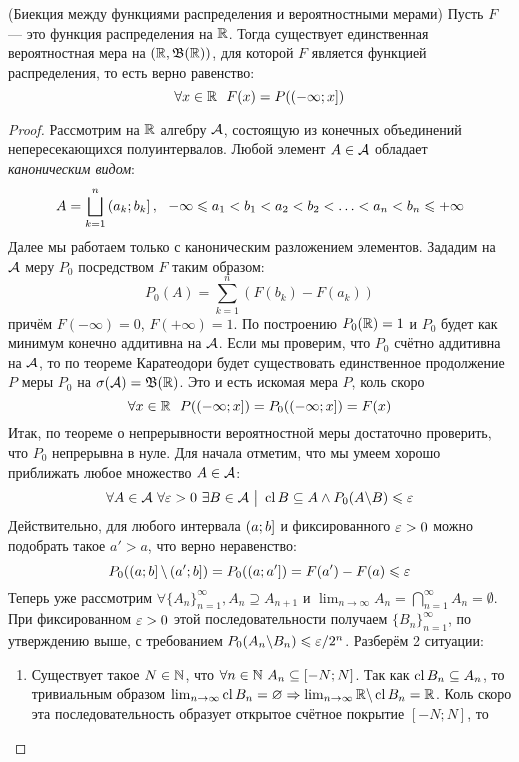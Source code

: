 \begin{theorem} (Биекция между функциями распределения и вероятностными мерами)
	Пусть $F$ --- это функция распределения на $\mathbb{R}$. Тогда существует единственная вероятностная мера на $(\mathbb{R}, \mathfrak{B}(\mathbb{R}))$, для которой $F$ является функцией распределения, то есть верно равенство:
	\[
		\forall x \in \mathbb{R}\ \ F(x) = P(\left(-\infty; x\right])
	\]
\end{theorem}

\begin{proof}
	Рассмотрим на $\mathbb{R}$ алгебру $\mathcal{A}$, состоящую из конечных объединений непересекающихся полуинтервалов. Любой элемент $A \in \mathcal{A}$ обладает \textit{каноническим видом}:
	\[
		A = \bigsqcup_{k = 1}^n \left(a_k; b_k\right],\ \ -\infty \leqslant a_1 < b_1 < a_2 < b_2 < \ldots < a_n < b_n \leqslant +\infty
	\]
	Далее мы работаем только с каноническим разложением элементов. Зададим на $\mathcal{A}$ меру $P_0$ посредством $F$ таким образом:
	\[
		P_0(A) = \sum_{k = 1}^n (F(b_k) - F(a_k))
	\]
	причём $F(-\infty) = 0$, $F(+\infty) = 1$. По построению $P_0(\mathbb{R}) = 1$ и $P_0$ будет как минимум конечно аддитивна на $\mathcal{A}$. Если мы проверим, что $P_0$ счётно аддитивна на $\mathcal{A}$, то по теореме Каратеодори будет существовать единственное продолжение $P$ меры $P_0$ на $\sigma(\mathcal{A}) = \mathfrak{B}(\mathbb{R})$. Это и есть искомая мера $P$, коль скоро
	\[
		\forall x \in \R\ \ P(\rsi{-\infty; x}) = P_0(\rsi{-\infty; x}) = F(x)
	\]
	Итак, по теореме о непрерывности вероятностной меры достаточно проверить, что $P_0$ непрерывна в нуле. Для начала отметим, что мы умеем хорошо приближать любое множество $A \in \mathcal{A}$:
	\[
		\forall A \in \mathcal{A}\ \forall \varepsilon > 0\ \exists B \in \mathcal{A} \ \big|\  \operatorname{cl} B \subseteq A \wedge P_0(A \backslash B) \leqslant \varepsilon
	\]
	Действительно, для любого интервала $\left(a; b\right]$ и фиксированного $\varepsilon > 0$ можно подобрать такое $a' > a$, что верно неравенство:
	\[
		P_0(\left(a; b\right] \backslash \left(a'; b\right]) = P_0(\left(a; a'\right]) = F(a') - F(a) \leqslant \varepsilon
	\]
	Теперь уже рассмотрим $\forall \{A_n\}_{n = 1}^\infty, A_n \supseteq A_{n + 1}$ и $\lim_{n \to \infty} A_n = \bigcap_{n = 1}^\infty A_n = \emptyset$. При фиксированном $\varepsilon > 0$ этой последовательности получаем $\{B_n\}_{n = 1}^\infty$, по утверждению выше, с требованием $P_0(A_n \backslash B_n) \leqslant \varepsilon / 2^n$. Разберём 2 ситуации:
	\begin{enumerate}
		\item Существует такое $N \in \mathbb{N}$, что $\forall n \in \mathbb{N}\ A_n \subseteq [-N; N]$. Так как $\operatorname{cl} B_n \subseteq A_n$, то тривиальным образом $\lim_{n \to \infty} \operatorname{cl} B_n = \varnothing \Rightarrow \lim_{n \to \infty} \mathbb{R} \backslash \operatorname{cl} B_n = \mathbb{R}$. Коль скоро эта последовательность образует открытое счётное покрытие $[-N; N]$, то

\end{enumerate}
\end{proof}
